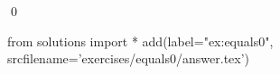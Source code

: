 
\begin{ex} 
  \label{ex:equals0}
  
  \qed
\end{ex} 
\begin{python0}
from solutions import *
add(label="ex:equals0",
    srcfilename='exercises/equals0/answer.tex') 
\end{python0}
